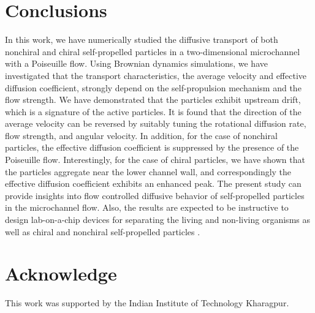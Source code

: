 \documentclass[aps,pre,preprint,superscriptaddress,amsmath,amssymb,nofootinbib]{revtex4}
\begin{document}
\section{Conclusions}\label{Conclusions}

In this work, we have numerically studied the diffusive transport of both nonchiral and chiral self-propelled particles in a two-dimensional microchannel with a Poiseuille flow. 
Using Brownian dynamics simulations, we have investigated that the transport characteristics, the average velocity and effective diffusion coefficient, strongly depend on the self-propulsion mechanism and the flow strength. 
We have demonstrated that the particles exhibit upstream drift, which is a signature of the active particles. 
It is found that the direction of the average velocity can be reversed by suitably tuning the rotational diffusion rate, flow strength, and angular velocity. 
In addition, for the case of nonchiral particles, the effective diffusion coefficient is suppressed by the presence of the Poiseuille flow. 
Interestingly, for the case of chiral particles, we have shown that the particles aggregate near the lower channel wall, and correspondingly the effective diffusion coefficient exhibits an enhanced peak. 
The present study can provide insights into flow controlled diffusive behavior of self-propelled particles in the microchannel flow.
Also, the results are expected to be instructive to design lab-on-a-chip devices for separating the living and non-living organisms as well as chiral and nonchiral self-propelled particles \cite{Chin_Lab, Yang_SM}. 




\section{Acknowledge}
This work was supported by the Indian Institute of Technology Kharagpur. 
\end{document}
